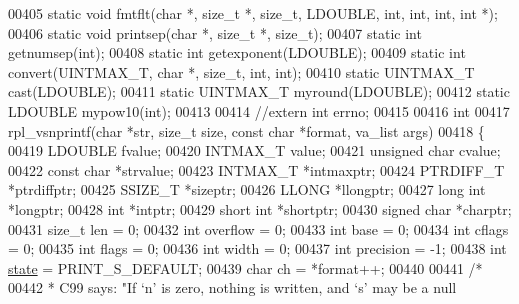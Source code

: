 \begin{DoxyCode}
{00405 \textcolor{keyword}{static} \textcolor{keywordtype}{void} fmtflt(\textcolor{keywordtype}{char} *, \textcolor{keywordtype}{size\_t} *, \textcolor{keywordtype}{size\_t}, LDOUBLE, \textcolor{keywordtype}{int}, \textcolor{keywordtype}{int}, \textcolor{keywordtype}{int}, \textcolor{keywordtype}{int} *);
00406 \textcolor{keyword}{static} \textcolor{keywordtype}{void} printsep(\textcolor{keywordtype}{char} *, \textcolor{keywordtype}{size\_t} *, \textcolor{keywordtype}{size\_t});
00407 \textcolor{keyword}{static} \textcolor{keywordtype}{int} getnumsep(\textcolor{keywordtype}{int});
00408 \textcolor{keyword}{static} \textcolor{keywordtype}{int} getexponent(LDOUBLE);
00409 \textcolor{keyword}{static} \textcolor{keywordtype}{int} convert(UINTMAX\_T, \textcolor{keywordtype}{char} *, \textcolor{keywordtype}{size\_t}, \textcolor{keywordtype}{int}, \textcolor{keywordtype}{int});
00410 \textcolor{keyword}{static} UINTMAX\_T cast(LDOUBLE);
00411 \textcolor{keyword}{static} UINTMAX\_T myround(LDOUBLE);
00412 \textcolor{keyword}{static} LDOUBLE mypow10(\textcolor{keywordtype}{int});
00413 
00414 \textcolor{comment}{//extern int errno;}
00415 
00416 \textcolor{keywordtype}{int}
00417 rpl\_vsnprintf(\textcolor{keywordtype}{char} *str, \textcolor{keywordtype}{size\_t} size, \textcolor{keyword}{const} \textcolor{keywordtype}{char} *format, va\_list args)
00418 \{
00419     LDOUBLE fvalue;
00420     INTMAX\_T value;
00421     \textcolor{keywordtype}{unsigned} \textcolor{keywordtype}{char} cvalue;
00422     \textcolor{keyword}{const} \textcolor{keywordtype}{char} *strvalue;
00423     INTMAX\_T *intmaxptr;
00424     PTRDIFF\_T *ptrdiffptr;
00425     SSIZE\_T *sizeptr;
00426     LLONG *llongptr;
00427     \textcolor{keywordtype}{long} \textcolor{keywordtype}{int} *longptr;
00428     \textcolor{keywordtype}{int} *intptr;
00429     \textcolor{keywordtype}{short} \textcolor{keywordtype}{int} *shortptr;
00430     \textcolor{keywordtype}{signed} \textcolor{keywordtype}{char} *charptr;
00431     \textcolor{keywordtype}{size\_t} len = 0;
00432     \textcolor{keywordtype}{int} overflow = 0;
00433     \textcolor{keywordtype}{int} base = 0;
00434     \textcolor{keywordtype}{int} cflags = 0;
00435     \textcolor{keywordtype}{int} flags = 0;
00436     \textcolor{keywordtype}{int} width = 0;
00437     \textcolor{keywordtype}{int} precision = -1;
00438     \textcolor{keywordtype}{int} \hyperlink{structstate}{state} = PRINT\_S\_DEFAULT;
00439     \textcolor{keywordtype}{char} ch = *format++;
00440 
00441     \textcolor{comment}{/*}
00442 \textcolor{comment}{     * C99 says: "If `n' is zero, nothing is written, and `s' may be a null}
}
\end{DoxyCode}
